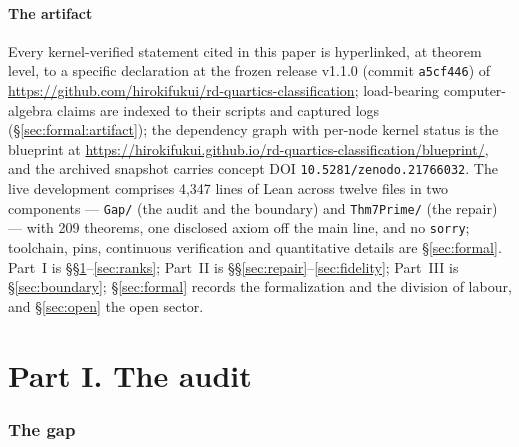\documentclass[11pt]{amsart}
\newcommand{\repourl}{https://github.com/hirokifukui/rd-quartics-classification}
\newcommand{\repotag}{v1.1.0}
\newcommand{\repocommit}{a5cf446}
\newcommand{\conceptdoi}{10.5281/zenodo.21766032}
\newcommand{\blueprinturl}{https://hirokifukui.github.io/rd-quartics-classification/blueprint/}
\begin{document}
\subsection{The artifact}\label{sec:intro:artifact}

Every kernel-verified statement cited in this paper is hyperlinked, at
theorem level, to a specific declaration at the frozen release
\repotag{} (commit \texttt{\repocommit}) of \url{\repourl};
load-bearing computer-algebra claims are indexed to their scripts and
captured logs (\S\ref{sec:formal:artifact}); the dependency graph
with per-node kernel status is the blueprint at \url{\blueprinturl},
and the archived snapshot carries concept DOI \texttt{\conceptdoi}.
The live development comprises 4{,}347 lines of Lean across twelve
files in two components --- \texttt{Gap/} (the audit and the boundary)
and \texttt{Thm7Prime/} (the repair) --- with 209 theorems, one
disclosed axiom off the main line, and no \texttt{sorry}; toolchain,
pins, continuous verification and quantitative details are
\S\ref{sec:formal}.  Part~I is \S\S\ref{sec:gap}--\ref{sec:ranks};
Part~II is \S\S\ref{sec:repair}--\ref{sec:fidelity}; Part~III is
\S\ref{sec:boundary}; \S\ref{sec:formal} records the formalization and
the division of labour, and \S\ref{sec:open} the open sector.

\part*{Part I. The audit}

\section{The gap}\label{sec:gap}
\end{document}
